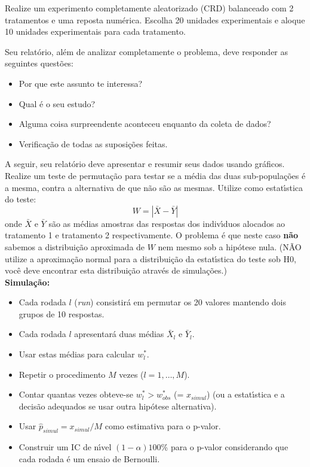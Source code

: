 \documentclass[12pt]{article}
\begin{document}
Realize um experimento completamente aleatorizado (CRD) balanceado com 2 tratamentos e uma reposta num\'erica. Escolha 20 unidades experimentais e aloque 10 unidades experimentais para cada tratamento.

Seu relat\'orio, al\'{e}m de analizar completamente o problema,
deve responder as seguintes quest\~{o}es: 
\begin{itemize}
\item Por que este assunto te interessa?
\item Qual \'{e} o seu estudo?
\item Alguma coisa surpreendente aconteceu enquanto da coleta de
  dados?
\item Verifica\c{c}\~{a}o de todas as suposi\c{c}\~{o}es feitas.
\end{itemize}

A seguir, seu relat\'orio deve apresentar e resumir seus dados usando gr\'aficos. Realize um teste de permuta\c c\~ao para testar se a m\'edia das duas sub-popula\c c\~oes \'e a mesma,  contra a alternativa de que n\~ao s\~ao as mesmas. Utilize como estat\'\i stica  do teste:
$$ W = |\bar{X} - \bar{Y}|$$
onde $\bar{X}$ e $\bar{Y}$ s\~ao as m\'edias amostras das respostas dos indiv\'\i duos alocados ao tratamento 1 e tratamento 2 respectivamente. 
O problema \'e que neste caso {\bf n\~ao} sabemos a distribui\c c\~ao aproximada de $W$
nem mesmo sob a hip\'otese nula. (N\~AO utilize a aproxima\c c\~ao normal
para a distribui\c c\~ao da estat\'\i stica do teste sob H0, voc\^e deve encontrar esta
distribui\c c\~ao atrav\'es de simula\c c\~oes.) \\

{\bf Simula\c c\~ao:} 
\begin{itemize}
\item Cada rodada $l$ ({\it run}) consistir\'a em permutar os 20 valores mantendo dois grupos de 10 respostas. 
\item Cada rodada $l$ apresentar\'a duas m\'edias $\bar{X}_l$ e $\bar{Y}_l$. 
\item Usar estas m\'edias para calcular $w^*_{l}$.
\item Repetir o procedimento $M$ vezes ($l=1,\ldots,M$). 
\item  Contar quantas vezes obteve-se  $w^*_{l} > w^*_{obs}$ (= $x_{simul}$) (ou a estat\'\i stica e a decis\~ao adequados se usar outra  hip\'otese alternativa). 
\item Usar $\hat{p}_{simul} = x_{simul}/M$ como estimativa para o p-valor.
\item Construir um IC de n\'\i vel $(1-\alpha)100$\% para o p-valor
  considerando que cada rodada \'e um ensaio de Bernoulli.
\end{itemize}
\end{document}
